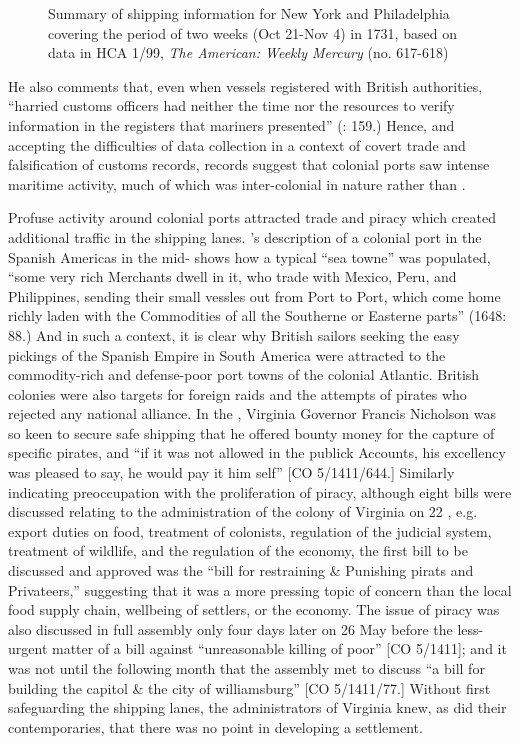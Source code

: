 \begin{figure}
\caption{\label{tab:key:4.3} Summary of shipping information for New York and Philadelphia covering the period of two weeks (Oct 21-Nov 4) in 1731, based on data in HCA 1/99, \textit{The American: Weekly Mercury} (no. 617-618)}
\end{figure}
 

He also comments that, even when vessels registered with British authorities, “harried customs officers had neither the time nor the resources to verify information in the registers that mariners presented” (\citealt{Jarvis2010}: 159.) Hence, and accepting the difficulties of data collection in a context of covert trade and falsification of customs records, records suggest that colonial ports saw intense maritime activity, much of which was inter-colonial in nature rather than . 

Profuse activity around colonial ports attracted  trade and piracy which created additional traffic in the shipping lanes. \citeauthor{Gage1648}’s description of a colonial port in the Spanish Americas in the mid- shows how a typical “sea towne” was populated, “some very rich Merchants dwell in it, who trade with Mexico, Peru, and Philippines, sending their small vessles out from Port to Port, which come home richly laden with the Commodities of all the Southerne or Easterne parts” (1648: 88.) And in such a context, it is clear why British sailors seeking the easy pickings of the Spanish Empire in South America were attracted to the commodity-rich and defense-poor port towns of the colonial Atlantic. British colonies were also targets for foreign raids and the attempts of pirates who rejected any national alliance. In the , Virginia Governor Francis Nicholson was so keen to secure safe shipping that he offered bounty money for the capture of specific pirates, and “if it was not allowed in the publick Accounts, his excellency was pleased to say, he would pay it him self” [CO 5/1411/644.] Similarly indicating preoccupation with the proliferation of piracy, although eight bills were discussed relating to the administration of the colony of Virginia on 22 \citealt{May1699}, e.g. export duties on food, treatment of colonists, regulation of the judicial system, treatment of wildlife, and the regulation of the economy, the first bill to be discussed and approved was the “bill for restraining \& Punishing pirats and Privateers,” suggesting that it was a more pressing topic of concern than the local food supply chain, wellbeing of settlers, or the economy. The issue of piracy was also discussed in full assembly only four days later on 26 May before the less-urgent matter of a bill against “unreasonable killing of poor” [CO 5/1411]; and it was not until the following month that the assembly met to discuss “a bill for building the capitol \& the city of williamsburg” [CO 5/1411/77.] Without first safeguarding the shipping lanes, the administrators of Virginia knew, as did their contemporaries, that there was no point in developing a settlement. 

